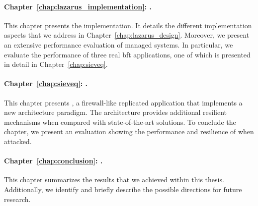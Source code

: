 \paragraph{Chapter~\ref{chap:lazarus_implementation}: .}
This chapter presents the \system implementation. 
It details the different implementation aspects that we address in Chapter~\ref{chap:lazarus_design}. 
Moreover, we present an extensive performance evaluation of \system managed systems.
In particular, we evaluate the performance of three real \gls{bft} applications, one of which is presented in detail in Chapter~\ref{chap:sieveq}.

\paragraph{Chapter~\ref{chap:sieveq}: .}
This chapter presents \sieveq, a firewall-like replicated application that implements a new architecture paradigm.
The \sieveq architecture provides additional resilient mechanisms when compared with state-of-the-art solutions.
To conclude the chapter, we present an evaluation showing the performance and resilience of \sieveq when attacked.



\paragraph{Chapter~\ref{chap:conclusion}: .}
This chapter summarizes the results that we achieved within this thesis.
Additionally, we identify and briefly describe the possible directions for future research.   

